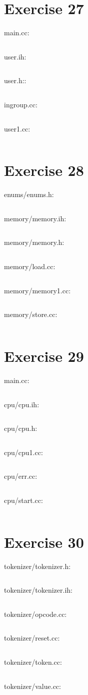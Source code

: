 \documentclass{article}[10pt]
\begin{document}
\section*{Exercise 27}
main.cc:
\inputminted[linenos=true, tabsize=4, frame=lines]{text}{../27/user/main.cc}
user.ih:
\inputminted[linenos=true, tabsize=4, frame=lines]{text}{../27/user/user.ih}
user.h::
\inputminted[linenos=true, tabsize=4, frame=lines]{text}{../27/user/user.h}
ingroup.cc:
\inputminted[linenos=true, tabsize=4, frame=lines]{text}{../27/user/ingroup.cc}
user1.cc:
\inputminted[linenos=true, tabsize=4, frame=lines]{text}{../27/user/user1.cc}

\section*{Exercise 28}
enums/enums.h:
\inputminted[linenos=true, tabsize=4, frame=lines]{text}{../virtualcpu/enums/enums.h}

memory/memory.ih:
\inputminted[linenos=true, tabsize=4, frame=lines]{text}{../virtualcpu/memory/memory.ih}

memory/memory.h:
\inputminted[linenos=true, tabsize=4, frame=lines]{text}{../virtualcpu/memory/memory.h}

memory/load.cc:
\inputminted[linenos=true, tabsize=4, frame=lines]{text}{../virtualcpu/memory/load.cc}

memory/memory1.cc:
\inputminted[linenos=true, tabsize=4, frame=lines]{text}{../virtualcpu/memory/memory1.cc}

memory/store.cc:
\inputminted[linenos=true, tabsize=4, frame=lines]{text}{../virtualcpu/memory/store.cc}

\section*{Exercise 29}
main.cc:
\inputminted[linenos=true, tabsize=4, frame=lines]{text}{../virtualcpu/main.cc}
cpu/cpu.ih:
\inputminted[linenos=true, tabsize=4, frame=lines]{text}{../virtualcpu/cpu/cpu.ih}
cpu/cpu.h:
\inputminted[linenos=true, tabsize=4, frame=lines]{text}{../virtualcpu/cpu/cpu.h}
cpu/cpu1.cc:
\inputminted[linenos=true, tabsize=4, frame=lines]{text}{../virtualcpu/cpu/cpu1.cc}
cpu/err.cc:
\inputminted[linenos=true, tabsize=4, frame=lines]{text}{../virtualcpu/cpu/err.cc}
cpu/start.cc:
\inputminted[linenos=true, tabsize=4, frame=lines]{text}{../virtualcpu/cpu/start.cc}
\section*{Exercise 30} 
tokenizer/tokenizer.h:
\inputminted[linenos=true, tabsize=4, frame=lines]{text}{../virtualcpu/tokenizer/tokenizer.h}
tokenizer/tokenizer.ih:
\inputminted[linenos=true, tabsize=4, frame=lines]{text}{../virtualcpu/tokenizer/tokenizer.ih}
tokenizer/opcode.cc:
\inputminted[linenos=true, tabsize=4, frame=lines]{text}{../virtualcpu/tokenizer/opcode.cc}
tokenizer/reset.cc:
\inputminted[linenos=true, tabsize=4, frame=lines]{text}{../virtualcpu/tokenizer/reset.cc}
tokenizer/token.cc:
\inputminted[linenos=true, tabsize=4, frame=lines]{text}{../virtualcpu/tokenizer/token.cc}
tokenizer/value.cc:
\inputminted[linenos=true, tabsize=4, frame=lines]{text}{../virtualcpu/tokenizer/value.cc}
\end{document}
